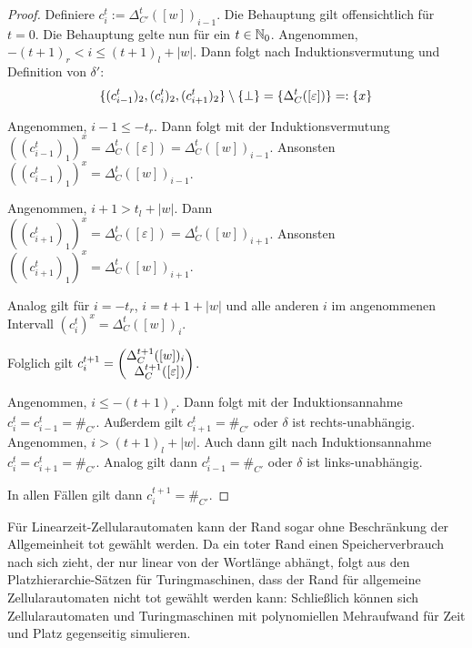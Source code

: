 \begin{proof}
    Definiere $c^t_i := \Delta_{C'}^t([w])_{i-1}$.
    Die Behauptung gilt offensichtlich für $t = 0$.
    Die Behauptung gelte nun für ein $t \in \mathbb{N}_0$.
    Angenommen, $-(t+1)_r < i \leq (t+1)_l + |w|$.
    Dann folgt nach Induktionsvermutung und Definition von $\delta'$: \[
    \{ { (c^t_{i-1})_2, (c^t_{i})_2, (c^t_{i+1})_2} \} \setminus \{ { \perp } \} = \{ { \Delta^t_{C}([\varepsilon])} \} =: \{ {x} \}
    \]
    
    Angenommen, $i - 1 \leq -t_r$. Dann folgt mit der Induktionsvermutung $((c^t_{i-1})_1)^x = \Delta^t_{C}([\varepsilon]) = \Delta^t_{C}([w])_{i-1}$.
    Ansonsten $((c^t_{i-1})_1)^x = \Delta^t_C([w])_{i-1}$.
    
    Angenommen, $i + 1 > t_l + |w|$. Dann $((c^t_{i+1})_1)^x = \Delta^t_{C}([\varepsilon]) = \Delta^t_{C}([w])_{i+1}$.
    Ansonsten $((c^t_{i+1})_1)^x = \Delta^t_C([w])_{i+1}$.
    
    Analog gilt für $i = -t_r$, $i = t + 1 + |w|$ und alle anderen $i$ im angenommenen Intervall $(c^t_{i})^x = \Delta^t_C([w])_i$.
    
    Folglich gilt $c^{t+1}_i = \Spvek{\Delta^{t+1}_C([w])_i; \Delta^{t+1}_{C}([\varepsilon])}$.
    
    Angenommen, $i \leq -(t+1)_r$. Dann folgt mit der Induktionsannahme $c^t_{i} = c^t_{i-1} = \#_{C'}$.
    Außerdem gilt $c^t_{i+1} = \#_{C'}$ oder $\delta$ ist rechts-unabhängig.
    Angenommen, $i > (t+1)_l + |w|$. Auch dann gilt nach Induktionsannahme $c^t_{i} = c^t_{i+1} = \#_{C'}$.
    Analog gilt dann $c^t_{i-1} = \#_{C'}$ oder $\delta$ ist links-unabhängig.
    
    In allen Fällen gilt dann $c^{t+1}_i = \#_{C'}$.
\end{proof}

Für Linearzeit-Zellularautomaten kann der Rand sogar ohne Beschränkung der Allgemeinheit tot gewählt werden.
Da ein toter Rand einen Speicherverbrauch nach sich zieht, der nur linear von der Wortlänge abhängt, folgt aus den Platzhierarchie-Sätzen für Turingmaschinen,
dass der Rand für allgemeine Zellularautomaten nicht tot gewählt werden kann:
Schließlich können sich Zellularautomaten und Turingmaschinen mit polynomiellen Mehraufwand für Zeit und Platz gegenseitig simulieren.


